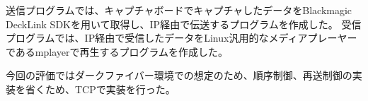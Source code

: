 送信プログラムでは、キャプチャボードでキャプチャしたデータをBlackmagic DeckLink SDK\cite{bmd-decklink-sdk}を用いて取得し、IP経由で伝送するプログラムを作成した。
受信プログラムでは、IP経由で受信したデータをLinux汎用的なメディアプレーヤーであるmplayerで再生するプログラムを作成した\cite{bmd-4k-streaming}。

今回の評価ではダークファイバー環境での想定のため、順序制御、再送制御の実装を省くため、TCPで実装を行った。

